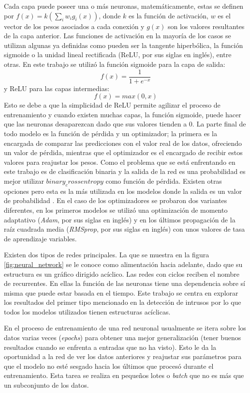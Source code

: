 Cada capa puede poseer una o más neuronas, matemáticamente, estas se definen por $f(x) = k(\sum_{i}w_{i}g_{i}(x))$, donde $k$ es la función de activación, $w$ es el vector de los pesos asociados a cada conexión y $g(x)$ son los valores resultantes de la capa anterior. Las funciones de activación en la mayoría de los casos se utilizan algunas ya definidas como pueden ser la tangente hiperbólica, la función sigmoide o la unidad lineal rectificada (ReLU, por sus siglas en inglés), entre otras. En este trabajo se utilizó la función sigmoide para la capa de salida: \[f(x) = \frac{1}{1 + e^{-x}}\] y ReLU para las capas intermedias: \[f(x)=max(0,x)\]
Esto se debe a que la simplicidad de ReLU permite agilizar el proceso de entrenamiento y cuando existen muchas capas, la función sigmoide, puede hacer que las neuronas desaparezcan dado que sus valores tienden a 0. La parte final de todo modelo es la función de pérdida y un optimizador; la primera es la encargada de comparar las predicciones con el valor real de los datos, ofreciendo un valor de pérdida, mientras que el optimizador es el encargado de recibir estos valores para reajustar los pesos. Como el problema que se está enfrentando en este trabajo es de clasificación binaria y la salida de la red es una probabilidad es mejor utilizar $binary_crossentropy$ como función de pérdida. Existen otras opciones pero esta es la más utilizada en los modelos donde la salida es un valor de probabilidad \cite{10.5555/3203489}. En el caso de los optimizadores se probaron dos variantes diferentes, en los primeros modelos se utilizó una optimizaci\'on de momento adaptativo (\textit{Adam}, por sus siglas en inglés) \cite{kingma2014adam} y en los últimos propagación de la raíz cuadrada media (\textit{RMSprop}, por sus siglas en inglés) \cite{tieleman2012lecture} con unos valores de tasa de aprendizaje variables.

Existen dos tipos de redes principales. La que se muestra en la figura \ref{fig:neural_network} se le conoce como alimentación hacia adelante, dado que su estructura es un gráfico dirigido acíclico. Las redes con ciclos reciben el nombre de recurrentes. En ellas la función de las neuronas tiene una dependencia sobre s\'i misma que puede estar basada en el tiempo. Este trabajo se centra en explorar los resultados del primer tipo mencionado en la detección de intrusos por lo que todos los modelos utilizados tienen estructuras ac\'iclicas.

En el proceso de entrenamiento de una red neuronal usualmente se itera sobre los datos varias veces (\textit{epochs}) para obtener una mejor generalización (tener buenos resultados cuando se enfrenta a entradas que no ha visto). Esto le da la oportunidad a la red de ver los datos anteriores y reajustar sus parámetros para que el modelo no esté sesgado hacia los últimos que procesó durante el entrenamiento. Esta tarea se realiza en pequeños lotes o \textit{batch} que no es más que un subconjunto de los datos.

